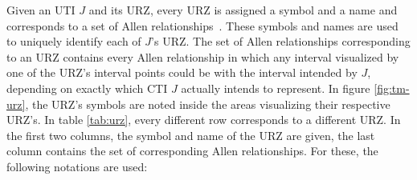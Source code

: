 Given an UTI $J$ and its URZ, every URZ is assigned a symbol and a name and corresponds to a set of Allen relationships~\cite{DeTre2012}. These symbols and names are used to uniquely identify each of $J$'s URZ. The set of Allen relationships corresponding to an URZ contains every Allen relationship in which any interval visualized by one of the URZ's interval points could be with the interval intended by $J$, depending on exactly which CTI $J$ actually intends to represent. In figure \ref{fig:tm-urz}, the URZ's symbols are noted inside the areas visualizing their respective URZ's. In table \ref{tab:urz}, every different row corresponds to a different URZ. In the first two columns, the symbol and name of the URZ are given, the last column contains the set of corresponding Allen relationships. For these, the following notations are used:

